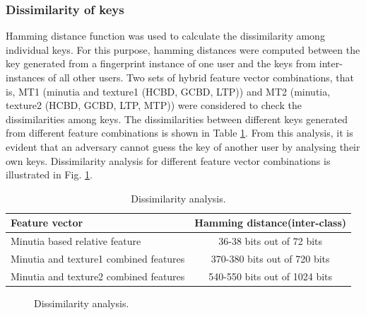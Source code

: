 \subsubsection{Dissimilarity of keys}
Hamming distance function was used to calculate the dissimilarity among individual keys. 
For this purpose, hamming distances were computed between the key generated from 
a fingerprint instance of one user and the keys from inter-instances of all other users.
Two sets of hybrid feature vector combinations, that is, MT1 (minutia
and texture1 (HCBD, GCBD, LTP)) and MT2 (minutia, texture2 (HCBD, GCBD, LTP,
MTP)) were considered to check the dissimilarities among keys. The
dissimilarities between different keys generated from different feature
combinations is shown in Table \ref{table:diss1}. From this analysis, it is
evident that an adversary cannot guess the key of another user by analysing their own keys. Dissimilarity analysis for different feature vector combinations is illustrated in Fig. \ref{fig:dissimilarity}.
\begin{table}[!t]
	\caption{Dissimilarity analysis.}
	\label{table:diss1}
	\begin{center}
		\begin{tabular}{|l |c|}
			\hline
			Feature vector                         & Hamming
			distance(inter-class)
			\\ [0.5ex]
			\hline
			Minutia based relative feature         & 36-38 bits out of 72 bits
			\\
			Minutia and texture1 combined features & 370-380 bits out of 720
			bits
			\\
			Minutia and texture2 combined features & 540-550 bits out of 1024
			bits
			\\
			\hline
		\end{tabular}%
	\end{center}

\end{table}
\begin{figure}[!ht]
	\centering
	 
	\caption{Dissimilarity analysis.}
	\label{fig:dissimilarity}
	\vspace{-4mm}
\end{figure}\par

